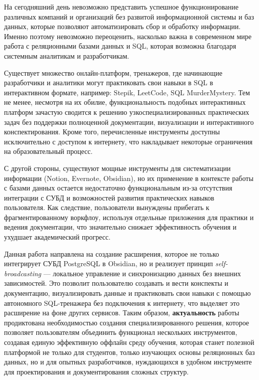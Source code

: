\documentclass[14pt]{extarticle}
\begin{document}
	На сегодняшний день невозможно представить успешное функционирование различных компаний и организаций без развитой информационной системы и баз данных, которые позволяют автоматизировать сбор и обработку информации. Именно поэтому невозможно переоценить, насколько важна в современном мире работа с реляционными базами данных и SQL, которая возможна благодаря системным аналитикам и разработчикам.
	\vspace{1em} 
	
	Существует множество онлайн-платформ, тренажеров, где начинающие разработчики и аналитики могут практиковать свои навыки в SQL в интерактивном формате, например: Stepik, LeetCode, SQL MurderMystery. Тем не менее, несмотря на их обилие, функциональность подобных интерактивных платформ зачастую сводится к решению узкоспециализированных практических задач без поддержки полноценной документации, визуализации и интерактивного конспектирования. Кроме того, перечисленные инструменты доступны исключительно с доступом к интернету, что накладывает некоторые ограничения на образовательный процесс. 
	\vspace{1em}
	
	С другой стороны, существуют мощные инструменты для систематизации информации (Notion, Evernote, Obsidian), но их применение в контексте работы с базами данных остается недостаточно функциональным из-за отсутствия интеграции с СУБД и возможностей развития практических навыков пользователя. Как следствие, пользователи вынуждены прибегать к фрагментированному воркфлоу, используя отдельные приложения для практики и ведения документации, что значительно снижает эффективность обучения и ухудшает академический прогресс.
	\vspace{1em}
	
	Данная работа направлена на создание расширения, которое не только интегрирует СУБД PostgreSQL в Obsidian, но и реализует принцип \textit{self-broadcasting} — локальное управление и синхронизацию данных без внешних зависимостей. Это позволит пользователю создавать и вести конспекты и документацию, визуализировать данные и практиковать свои навыки с помощью автономного SQL-тренажера без подключения к интернету, что выделяет это расширение на фоне других сервисов. Таким образом, \textbf{актуальность} работы продиктована необходимостью создания специализированного решения, которое позволяет пользователям объединить функционал нескольких инструментов, создавая единую эффективную оффлайн среду обучения, которая станет полезной платформой не только для студентов, только изучающих основы реляционных баз данных, но и для опытных разработчиков, нуждающихся в удобном инструменте для проектирования и документирования сложных структур.
	
\end{document}
